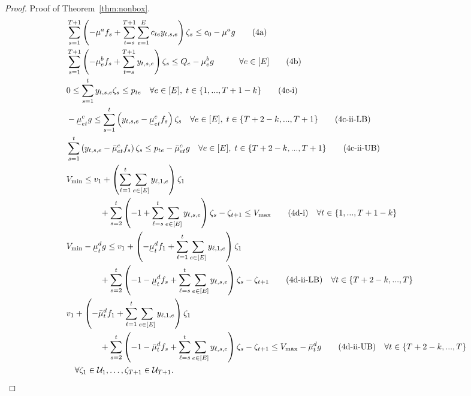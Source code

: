 \documentclass[nonblindrev,mnsc]{informs3} %
\newcommand{\ubar}[1]{\text{\b{$#1$}}}
\begin{document}
\begin{APPENDICES}
\begin{proof}{Proof of Theorem~\ref{thm:nonbox}.}
 \begin{align}
    & && \sum_{s=1}^{T +1}  \left( -\mu^a f_s +\sum_{t=s}^{T+1} \sum_{e=1}^E c_{te} y_{t,s,e} \right)  \zeta_s \le c_0 -\mu^a g \tag{4a} \label{budget-2a} \\
    &&&\sum_{s=1}^{T+1} \left( -\mu^b_e f_s +\sum_{t=s}^{T+1} y_{t,s,e} \right) \zeta_s \le  Q_e -\mu^b_e g \quad \quad \quad   \forall e \in[E] \tag{4b} \label{budget-2b} \\
   &&& 0 \le  \sum_{s=1}^{t}  y_{t,s,e} \zeta_s  \le p_{te} \quad \forall  e\in[E],\; t \in \{1,...,T+1-k\} \tag{4c-i} \label{budget-2c-i}\\
   &&& -\ubar{\mu}^c_{et} g \le  \sum_{s=1}^{t}  \left(y_{t,s,e}-\ubar{\mu}^c_{et}f_s\right) \zeta_s   \quad \forall  e\in[E],\; t \in \{T+2-k,..., T+1\} \tag{4c-ii-LB} \label{budget-2c-ii-LB}\\
   &&&  \sum_{s=1}^{t}  \left(y_{t,s,e}-\bar{\mu}^c_{et}f_s\right) \zeta_s  \le  p_{te} -\bar{\mu}^c_{et} g \quad \forall  e\in[E],\; t \in \{T+2-k,..., T+1\} \tag{4c-ii-UB} \label{budget-2c-ii-UB}\\
   &&&V_{\textnormal{min}} \le  v_1 + \left( \sum_{\ell=1}^t \sum_{e \in [E]} y_{\ell,1,e} \right) \zeta_1 \nonumber \\
   &&& \quad \quad \quad \quad + \sum_{s=2}^t \left(-1 + \sum_{\ell=s}^t \sum_{e \in [E]} y_{\ell,s,e} \right) \zeta_s - \zeta_{t+1} \le  V_{\textnormal{max}}   \tag{4d-i} \label{budget-2d-i}\quad  \forall  t \in \{1,...,T+1-k\}\\
   &&&V_{\textnormal{min}} -\ubar{\mu}_t^d g \le  v_1 + \left(-\ubar{\mu}_t^d f_1+ \sum_{\ell=1}^t \sum_{e \in [E]} y_{\ell,1,e} \right) \zeta_1 \nonumber \\
   &&& \quad \quad \quad \quad + \sum_{s=2}^t \left(-1 -\ubar{\mu}_t^d f_s + \sum_{\ell=s}^t \sum_{e \in [E]} y_{\ell,s,e} \right) \zeta_s - \zeta_{t+1}    \tag{4d-ii-LB} \label{budget-2d-ii-LB}\quad  \forall  t \in \{T+2-k,..., T\}\\
   &&&  v_1 + \left( -\bar{\mu}_t^d f_1 +\sum_{\ell=1}^t \sum_{e \in [E]} y_{\ell,1,e} \right) \zeta_1 \nonumber \\
   &&& \quad \quad \quad \quad + \sum_{s=2}^t \left(-1 -\bar{\mu}_t^d f_s + \sum_{\ell=s}^t \sum_{e \in [E]} y_{\ell,s,e} \right) \zeta_s - \zeta_{t+1}   \le  V_{\textnormal{max}} -\bar{\mu}_t^d g \tag{4d-ii-UB} \label{budget-2d-ii-UB}\quad  \forall  t \in\{T+2-k,..., T\}\\
   &&& \quad \forall \zeta_1 \in \mathcal{U}_1,\ldots,\zeta_{T+1} \in \mathcal{U}_{T+1} \nonumber.
    \end{align}


\end{proof}
\end{APPENDICES}
\end{document}
